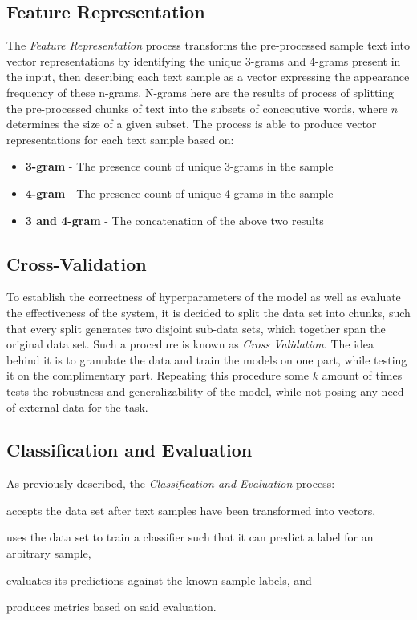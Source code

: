 \documentclass[conference]{sig-alternate-05-2015}
\begin{document}
\subsection{Feature Representation}\label{subsec:feature_rep}
The \textit{Feature Representation} process transforms the pre-processed sample
text into vector representations by identifying the unique 3-grams and 4-grams
present in the input, then describing each text sample as a vector expressing
the appearance frequency of these n-grams. N-grams here are the results of process
of splitting the pre-processed chunks of text into the subsets of concequtive
words, where $n$ determines the size of a given subset. The process is able to 
produce vector representations for each text sample based on:
\begin{itemize}
  \item \textbf{3-gram} - The presence count of unique 3-grams in the sample
  \item \textbf{4-gram} - The presence count of unique 4-grams in the sample
  \item \textbf{3 and 4-gram} - The concatenation of the above two results
\end{itemize}

\subsection{Cross-Validation}\label{subsec:cross_validation}
To establish the correctness of hyperparameters of the model as well as 
evaluate the effectiveness of the system, it is decided to split the data set
into chunks, such that every split generates two disjoint sub-data sets,
which together span the original data set. Such a procedure is known as
\textit{Cross Validation}. The idea behind it is to granulate the data and 
train the models on one part, while testing it on the complimentary part.
Repeating this procedure some $k$ amount of times tests the robustness and 
generalizability of the model, while not posing any need of external data for 
the task.


\subsection{Classification and Evaluation}\label{subsec:classification}
As previously described, the \textit{Classification and Evaluation} process:
\begin{enumerate*}[(1)]
  \item accepts the data set after text samples have been transformed into
  vectors,
  \item uses the data set to train a classifier such that it can predict a label
  for an arbitrary sample,
  \item evaluates its predictions against the known sample labels, and
  \item produces metrics based on said evaluation.
\end{enumerate*}\par
\end{document}
